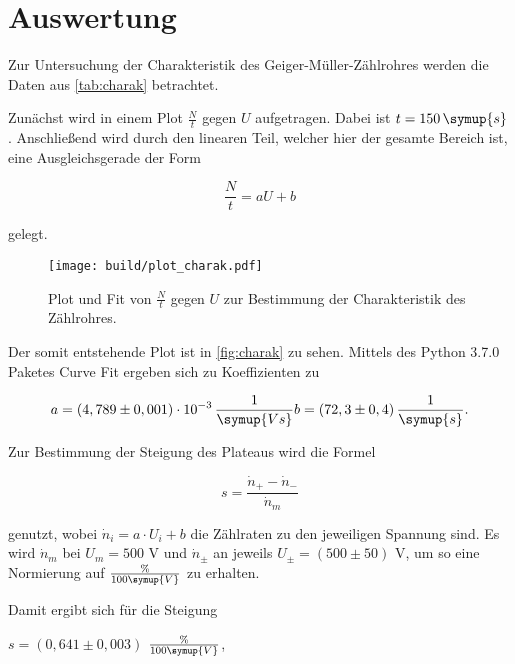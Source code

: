 \section{Auswertung}
\label{sec:Auswertung}

Zur Untersuchung der Charakteristik des Geiger-Müller-Zählrohres werden die Daten aus \autoref{tab:charak} betrachtet.



Zunächst wird in einem Plot $\frac{N}{t}$ gegen $U$ aufgetragen. Dabei ist $t = 150 \, \symup{s}$.
Anschließend wird durch den linearen Teil, welcher hier der gesamte Bereich ist, eine Ausgleichsgerade der Form

\begin{equation}
    \frac{N}{t} = a U + b
\end{equation}

gelegt.

\begin{figure}
  \centering
  \texttt{[image: build/plot\_charak.pdf]}
  \caption{Plot und Fit von $\frac{N}{t}$ gegen $U$ zur Bestimmung der Charakteristik des Zählrohres.}
  \label{fig:charak}
\end{figure}

Der somit entstehende Plot ist in \autoref{fig:charak} zu sehen.
Mittels des Python 3.7.0 Paketes Curve Fit ergeben sich zu Koeffizienten zu

\begin{align*}
    a = (4,789 \pm 0,001) \cdot 10^{-3} \, \frac{1}{\symup{Vs}}
    b = (72,3 \pm 0,4) \, \frac{1}{\symup{s}}.
\end{align*}

Zur Bestimmung der Steigung des Plateaus wird die Formel

\begin{equation}
    s = \frac{\dot{n}_+ - \dot{n}_-}{\dot{n}_m}
\end{equation}

genutzt, wobei $\dot{n}_i = a \cdot U_i + b$ die Zählraten zu den jeweiligen Spannung sind.
Es wird $\dot{n}_m$ bei $U_m = 500$ V und $\dot{n}_\pm$ an jeweils $U_\pm = (500 \pm 50)$ V, um so eine Normierung auf $\frac{\%}{100\symup{V}}$ zu erhalten.

Damit ergibt sich für die Steigung

\begin{center}
    $s = (0,641 \pm 0,003)$ $\frac{\%}{100\symup{V}}$,
\end{center}

